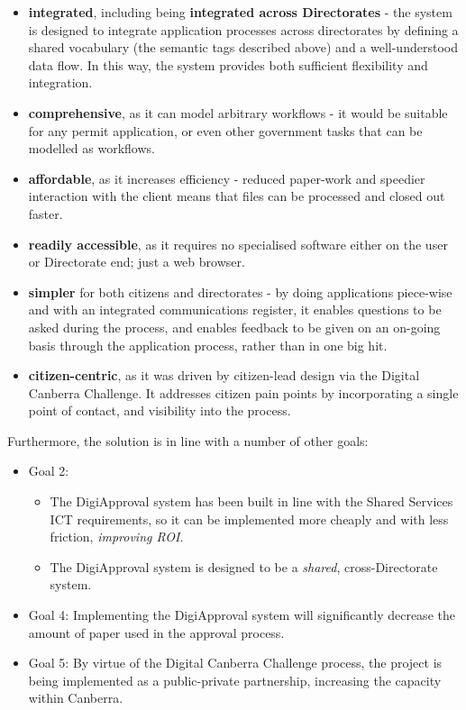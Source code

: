 \documentclass[12pt,a4paper,twosided]{article}
\begin{document}
\begin{itemize}

\item
  \textbf{integrated}, including being \textbf{integrated across
  Directorates} - the system is designed to integrate application
  processes across directorates by defining a shared vocabulary (the
  semantic tags described above) and a well-understood data flow. In
  this way, the system provides both sufficient flexibility and
  integration.
\item
  \textbf{comprehensive}, as it can model arbitrary workflows - it would
  be suitable for any permit application, or even other government tasks
  that can be modelled as workflows.
\item
  \textbf{affordable}, as it increases efficiency - reduced paper-work
  and speedier interaction with the client means that files can be
  processed and closed out faster.
\item
  \textbf{readily accessible}, as it requires no specialised software
  either on the user or Directorate end; just a web browser.
\item
  \textbf{simpler} for both citizens and directorates - by doing
  applications piece-wise and with an integrated communications
  register, it enables questions to be asked during the process, and
  enables feedback to be given on an on-going basis through the
  application process, rather than in one big hit.
\item
  \textbf{citizen-centric}, as it was driven by citizen-lead design via
  the Digital Canberra Challenge. It addresses citizen pain points by
  incorporating a single point of contact, and visibility into the
  process.
\end{itemize}

Furthermore, the solution is in line with a number of other goals:

\begin{itemize}

\item
  Goal 2:

  \begin{itemize}
  
  \item
    The DigiApproval system has been built in line with the Shared
    Services ICT requirements, so it can be implemented more cheaply and
    with less friction, \emph{improving ROI}.
  \item
    The DigiApproval system is designed to be a \emph{shared},
    cross-Directorate system.
  \end{itemize}
\item
  Goal 4: Implementing the DigiApproval system will significantly
  decrease the amount of paper used in the approval process.
\item
  Goal 5: By virtue of the Digital Canberra Challenge process, the
  project is being implemented as a public-private partnership,
  increasing the capacity within Canberra.
\end{itemize}
\end{document}
